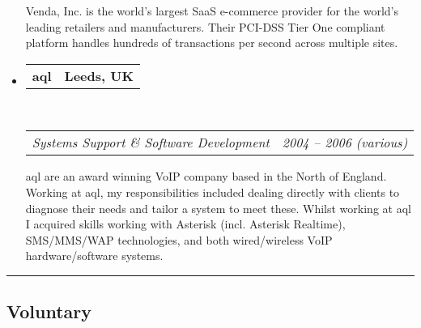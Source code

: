 \documentclass[10pt,a4paper]{article}
\makeatletter
\newcommand{\headerrow}[2]
{\begin{tabular*}{\linewidth}{l@{\extracolsep{\fill}}r}
	#1 &
	#2 \\
\end{tabular*}}
\makeatother
\begin{document}
\begin{itemize}
		Venda, Inc. is the world's largest SaaS e-commerce provider for the world's leading retailers and manufacturers. Their PCI-DSS Tier One compliant platform handles hundreds of transactions per second across multiple sites.


	\item
	\headerrow
		{\textbf{aql}}
		{\textbf{Leeds, UK}}
	\\
	\headerrow
		{\emph{Systems Support \& Software Development}}
		{\emph{2004 -- 2006 (various)}}

		aql are an award winning VoIP company based in the North of England. Working at aql, my responsibilities included dealing directly with clients to diagnose their needs and tailor a system to meet these. Whilst working at aql I acquired skills working with Asterisk (incl. Asterisk Realtime), SMS/MMS/WAP technologies, and both wired/wireless VoIP hardware/software systems.


\end{itemize}

\hrule
\vspace{-0.4em}
\subsection*{Voluntary}
\end{document}
